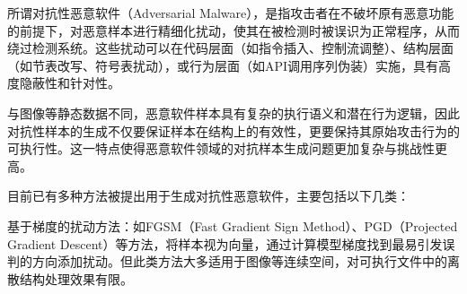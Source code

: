 所谓对抗性恶意软件（Adversarial Malware），是指攻击者在不破坏原有恶意功能的前提下，对恶意样本进行精细化扰动，使其在被检测时被误识为正常程序，从而绕过检测系统。这些扰动可以在代码层面（如指令插入、控制流调整）、结构层面（如节表改写、符号表扰动），或行为层面（如API调用序列伪装）实施，具有高度隐蔽性和针对性。


与图像等静态数据不同，恶意软件样本具有复杂的执行语义和潜在行为逻辑，因此对抗性样本的生成不仅要保证样本在结构上的有效性，更要保持其原始攻击行为的可执行性。这一特点使得恶意软件领域的对抗样本生成问题更加复杂与挑战性更高。



目前已有多种方法被提出用于生成对抗性恶意软件，主要包括以下几类：


基于梯度的扰动方法：如FGSM\cite{lupart2023study}（Fast Gradient Sign Method）、PGD\cite{bryniarski2021evading}（Projected Gradient Descent）等方法，将样本视为向量，通过计算模型梯度找到最易引发误判的方向添加扰动。但此类方法大多适用于图像等连续空间，对可执行文件中的离散结构处理效果有限。



